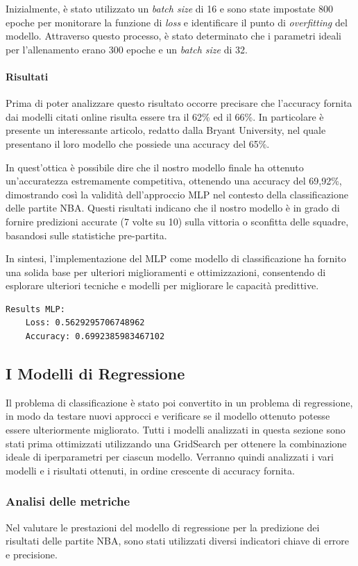 Inizialmente, è stato utilizzato un \textit{batch size} di 16 e sono state impostate 800 epoche per monitorare la funzione di \textit{loss} e identificare il punto di \textit{overfitting} del modello. Attraverso questo processo, è stato determinato che i parametri ideali per l'allenamento erano 300 epoche e un \textit{batch size} di 32.

\paragraph{Risultati}
Prima di poter analizzare questo risultato occorre precisare che l'accuracy fornita dai modelli citati online risulta essere tra il 62\% ed il 66\%. In particolare è presente un interessante articolo, redatto dalla Bryant University, nel quale presentano il loro modello che possiede una accuracy del 65\%.

In quest'ottica è possibile dire che il nostro modello finale ha ottenuto un'accuratezza estremamente competitiva, ottenendo una accuracy del 69,92\%, dimostrando così la validità dell'approccio MLP nel contesto della classificazione delle partite NBA. Questi risultati indicano che il nostro modello è in grado di fornire predizioni accurate (7 volte su 10) sulla vittoria o sconfitta delle squadre, basandosi sulle statistiche pre-partita.

In sintesi, l'implementazione del MLP come modello di classificazione ha fornito una solida base per ulteriori miglioramenti e ottimizzazioni, consentendo di esplorare ulteriori tecniche e modelli per migliorare le capacità predittive.
\begin{lstlisting}
Results MLP:
    Loss: 0.5629295706748962
    Accuracy: 0.6992385983467102
\end{lstlisting}


\subsection{I Modelli di Regressione}
Il problema di classificazione è stato poi convertito in un problema di regressione, in modo da testare nuovi approcci e verificare se il modello ottenuto potesse essere ulteriormente migliorato.
Tutti i modelli analizzati in questa sezione sono stati prima ottimizzati utilizzando una GridSearch per ottenere la combinazione ideale di iperparametri per ciascun modello. Verranno quindi analizzati i vari modelli e i risultati ottenuti, in ordine crescente di accuracy fornita.

\subsubsection{Analisi delle metriche}
Nel valutare le prestazioni del modello di regressione per la predizione dei risultati delle partite NBA, sono stati utilizzati diversi indicatori chiave di errore e precisione.

